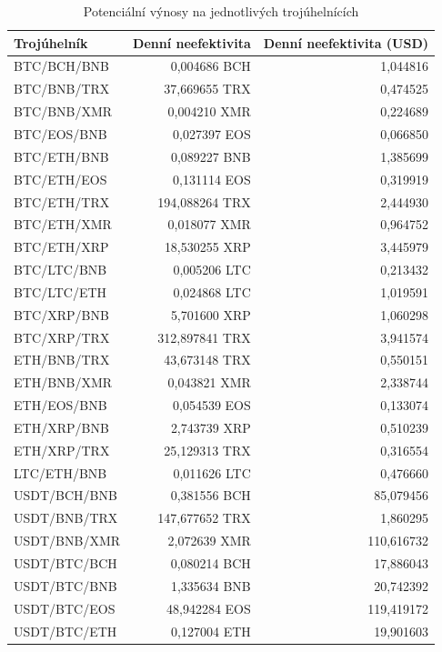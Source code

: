 \documentclass[thesis=B,czech]{FITthesis}[2019/03/21]
\begin{document}
\begin{table}\centering
\caption{Potenciální výnosy na jednotlivých trojúhelnících}
\label{table_gains}
\begin{tabular}{|| l | r | r ||}\hline Trojúhelník & Denní neefektivita & Denní neefektivita (USD)\\
 \hline\hline BTC/BCH/BNB & 0,004686 BCH & 1,044816\\ 
 \hline BTC/BNB/TRX & 37,669655 TRX & 0,474525\\ 
 \hline BTC/BNB/XMR & 0,004210 XMR & 0,224689\\ 
 \hline BTC/EOS/BNB & 0,027397 EOS & 0,066850\\ 
 \hline BTC/ETH/BNB & 0,089227 BNB & 1,385699\\ 
 \hline BTC/ETH/EOS & 0,131114 EOS & 0,319919\\ 
 \hline BTC/ETH/TRX & 194,088264 TRX & 2,444930\\ 
 \hline BTC/ETH/XMR & 0,018077 XMR & 0,964752\\ 
 \hline BTC/ETH/XRP & 18,530255 XRP & 3,445979\\ 
 \hline BTC/LTC/BNB & 0,005206 LTC & 0,213432\\ 
 \hline BTC/LTC/ETH & 0,024868 LTC & 1,019591\\ 
 \hline BTC/XRP/BNB & 5,701600 XRP & 1,060298\\ 
 \hline BTC/XRP/TRX & 312,897841 TRX & 3,941574\\ 
 \hline ETH/BNB/TRX & 43,673148 TRX & 0,550151\\ 
 \hline ETH/BNB/XMR & 0,043821 XMR & 2,338744\\ 
 \hline ETH/EOS/BNB & 0,054539 EOS & 0,133074\\ 
 \hline ETH/XRP/BNB & 2,743739 XRP & 0,510239\\ 
 \hline ETH/XRP/TRX & 25,129313 TRX & 0,316554\\ 
 \hline LTC/ETH/BNB & 0,011626 LTC & 0,476660\\ 
 \hline USDT/BCH/BNB & 0,381556 BCH & 85,079456\\ 
 \hline USDT/BNB/TRX & 147,677652 TRX & 1,860295\\ 
 \hline USDT/BNB/XMR & 2,072639 XMR & 110,616732\\ 
 \hline USDT/BTC/BCH & 0,080214 BCH & 17,886043\\ 
 \hline USDT/BTC/BNB & 1,335634 BNB & 20,742392\\ 
 \hline USDT/BTC/EOS & 48,942284 EOS & 119,419172\\ 
 \hline USDT/BTC/ETH & 0,127004 ETH & 19,901603\\ 

\end{tabular}
\end{table}
\end{document}
